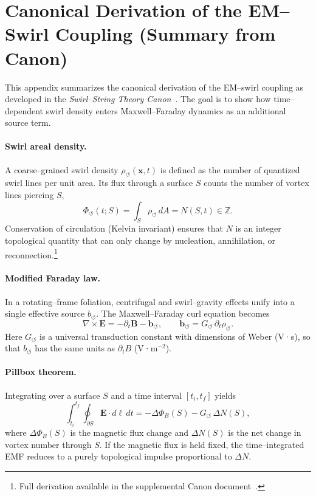 \documentclass[11pt]{article}
\begin{document}
\appendix

    \section{Canonical Derivation of the EM–Swirl Coupling (Summary from Canon)}
    \label{sec:canonical-derivation-of-the-emswirl-coupling}

        This appendix summarizes the canonical derivation of the EM–swirl coupling as developed in the
        \emph{Swirl–String Theory Canon}~\cite{Iskandarani_SST_Canon_v0_5_9_2025}. The goal is to show how
        time–dependent swirl density enters Maxwell–Faraday dynamics as an additional source term.

        \paragraph*{Swirl areal density.}
        A coarse–grained swirl density $\rho_{\circlearrowleft}(\mathbf{x},t)$ is defined as the number of
        quantized swirl lines per unit area. Its flux through a surface $S$ counts the number of vortex lines
        piercing $S$,
        \[
        \Phi_{\circlearrowleft}(t; S) = \int_S \rho_{\circlearrowleft} \, dA = N(S,t) \in \mathbb{Z}.
        \]
        Conservation of circulation (Kelvin invariant) ensures that $N$ is an integer topological quantity
        that can only change by nucleation, annihilation, or reconnection.\footnote{Full derivation available in the supplemental Canon document~\cite{Iskandarani_SST_Canon_v0_5_9_2025}.}

        \paragraph*{Modified Faraday law.}
        In a rotating–frame foliation, centrifugal and swirl–gravity effects unify into a single effective
        source $b_{\circlearrowleft}$. The Maxwell–Faraday curl equation becomes
        \[
        \nabla \times \mathbf{E} = -\partial_t \mathbf{B} - \mathbf{b}_{\circlearrowleft},
        \qquad
        \mathbf{b}_{\circlearrowleft} = G_{\circlearrowleft} \, \partial_t \rho_{\circlearrowleft}.
        \]
        Here $G_{\circlearrowleft}$ is a universal transduction constant with dimensions of Weber (V·s), so that
        $b_{\circlearrowleft}$ has the same units as $\partial_t B$ (V·m$^{-2}$).

        \paragraph*{Pillbox theorem.}
        Integrating over a surface $S$ and a time interval $[t_i,t_f]$ yields
        \[
        \int_{t_i}^{t_f} \!\! \oint_{\partial S} \mathbf{E}\cdot d\ell \, dt
        = - \Delta \Phi_B(S) - G_{\circlearrowleft}\, \Delta N(S),
        \]
        where $\Delta \Phi_B(S)$ is the magnetic flux change and $\Delta N(S)$ is the net change in vortex
        number through $S$. If the magnetic flux is held fixed, the time–integrated EMF reduces to a purely
        topological impulse proportional to $\Delta N$.
\end{document}
